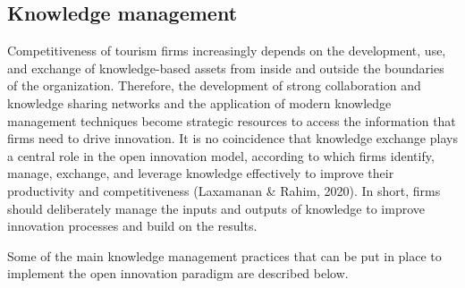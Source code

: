 \documentclass[
  letterpaper,
  DIV=11,
  numbers=noendperiod]{scrreprt}
\begin{document}
\hypertarget{knowledge-management-1}{%
\subsection{Knowledge management}\label{knowledge-management-1}}

Competitiveness of tourism firms increasingly depends on the
development, use, and exchange of knowledge-based assets from inside and
outside the boundaries of the organization. Therefore, the development
of strong collaboration and knowledge sharing networks and the
application of modern knowledge management techniques become strategic
resources to access the information that firms need to drive innovation.
It is no coincidence that knowledge exchange plays a central role in the
open innovation model, according to which firms identify, manage,
exchange, and leverage knowledge effectively to improve their
productivity and competitiveness (Laxamanan \& Rahim, 2020). In short,
firms should deliberately manage the inputs and outputs of knowledge to
improve innovation processes and build on the results.

Some of the main knowledge management practices that can be put in place
to implement the open innovation paradigm are described below.
\end{document}
